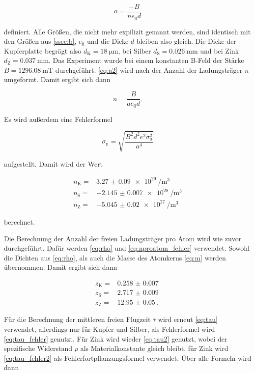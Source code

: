 \begin{equation}
    a = \frac{-B}{n e_0 d}
    \label{eq:a2}
\end{equation}

definiert.
Alle Größen, die nicht mehr expilizit genannt werden, sind identisch mit den Größen aus \autoref{ssec:b}, $e_0$ und die Dicke $d$ bleiben also gleich.
Die Dicke der Kupferplatte begrägt also $d_\text{K} = \SI{18}{\micro\meter}$, bei Silber $d_\text{S} = \SI{0.026}{\milli\meter}$ und bei Zink $d_\text{Z} = \SI{0.037}{\milli\meter}$.
Das Experiment wurde bei einem konstanten B-Feld der Stärke $B = \SI{1296.08}{\milli\tesla}$ durchgeführt.
\autoref{eq:a2} wird nach der Anzahl der Ladungsträger $n$ umgeformt.
Damit ergibt sich dann

\begin{equation}
    n = \frac{B}{a e_0 d}.
    \label{eq:n2}
\end{equation}

Es wird außerdem eine Fehlerformel 

\begin{equation}
    \sigma _\text{n} = \sqrt{\frac {B^{2} d^{2} e^{2} \sigma_{a}^{2} }{a^{4}}}
    \label{eq:n2_fehler}
\end{equation}

aufgestellt.
Damit wird der Wert

\begin{align}
    n_\text{K} =& \SI{3.27(9)e29}{\per\cubic\meter}\\
    n_\text{S} =& \SI{-2.145(7)e28}{\per\cubic\meter}\\
    n_\text{Z} =& \SI{-5.045(20)e27}{\per\cubic\meter}
    \label{eq:n2_wert}
\end{align}

berechnet.

Die Berechnung der Anzahl der freien Ladungsträger pro Atom wird wie zuvor durchgeführt.
Dafür werden \autoref{eq:rho} und \autoref{eq:nproatom_fehler} verwendet.
Sowohl die Dichten aus \autoref{eq:rho}, als auch die Masse des Atomkerns \autoref{eq:m} werden übernommen.
Damit ergibt sich dann 

\begin{align}
    z_\text{K} =& \SI{0.258(7)}{} \\
    z_\text{S} =& \SI{2.717(9)}{} \\
    z_\text{Z} =& \SI{12.95(5)}{}.
    \label{eq:z1}
\end{align}

Für die Berechnung der mittleren freien Flugzeit $\bar{\tau}$ wird erneut \autoref{eq:tau} verwendet, allerdings nur für Kupfer und Silber, als Fehlerformel wird \autoref{eq:tau_fehler} genutzt.
Für Zink wird wieder \autoref{eq:tau2} genutzt, wobei der spezifische Widerstand $\rho$ als Materialkonstante gleich bleibt, für Zink wird \autoref{eq:tau_fehler2} als Fehlerfortpflanzungsformel verwendet.
Über alle Formeln wird dann 

